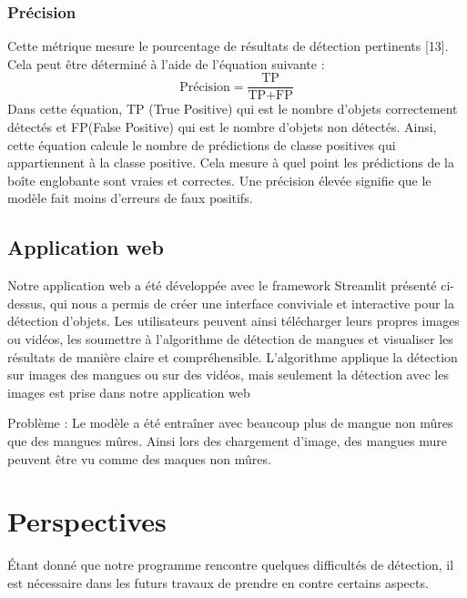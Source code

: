 \documentclass{article}
\begin{document}
	\subsubsection{Précision}
	Cette métrique mesure le pourcentage de résultats de détection pertinents [13]. Cela peut
	être déterminé à l’aide de l’équation suivante :
	\begin{equation}
		\text{Précision} = \frac{\text{TP}}{\text{TP} + \text{FP}}
	\end{equation}
	Dans cette équation, TP (True Positive) qui est le nombre d’objets correctement détectés et
	FP(False Positive) qui est le nombre d’objets non détectés. Ainsi, cette équation calcule le nombre
	de prédictions de classe positives qui appartiennent à la classe positive. Cela mesure à quel point
	les prédictions de la boîte englobante sont vraies et correctes. Une précision élevée signifie que le
	modèle fait moins d’erreurs de faux positifs.
	
	\subsection{Application web}
	Notre application web a été développée avec le framework Streamlit présenté ci-dessus, qui
	nous a permis de créer une interface conviviale et interactive pour la détection d’objets.
	Les utilisateurs peuvent ainsi télécharger leurs propres
	images ou vidéos, les soumettre à l’algorithme de détection de mangues et visualiser les résultats
	de manière claire et compréhensible.
	L’algorithme applique la détection sur images des mangues ou sur des vidéos, mais seulement la
	détection avec les images est prise dans notre application web
	
	Problème : Le modèle a été entraîner avec beaucoup plus de mangue non mûres que des mangues mûres. Ainsi lors des chargement d'image, des mangues mure peuvent être vu comme des maques non mûres.
	
	\section{Perspectives}
	
	Étant donné que notre programme rencontre quelques difficultés de détection, il est nécessaire
	dans les futurs travaux de prendre en contre certains aspects.
	
\end{document}
